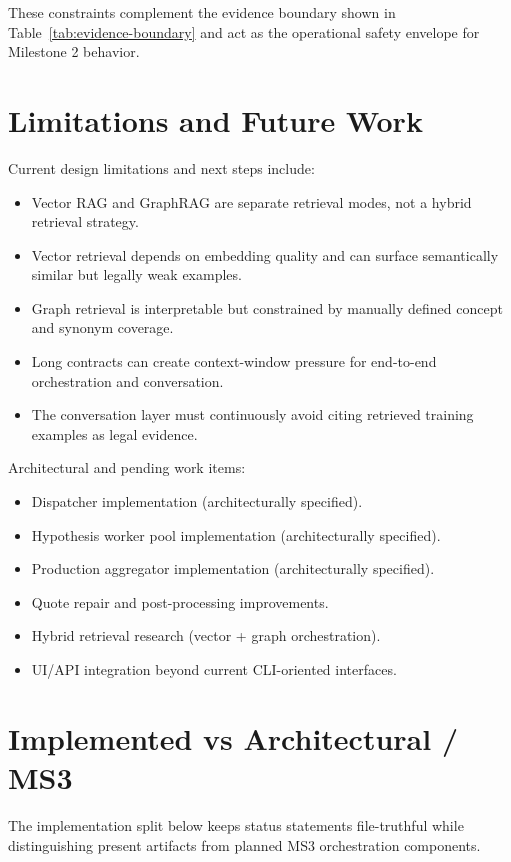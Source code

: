 \documentclass[11pt]{article}
\begin{document}
These constraints complement the evidence boundary shown in Table~\ref{tab:evidence-boundary} and act as the operational safety envelope for Milestone 2 behavior.

\section{Limitations and Future Work}
Current design limitations and next steps include:
\begin{itemize}
  \item Vector RAG and GraphRAG are separate retrieval modes, not a hybrid retrieval strategy.
  \item Vector retrieval depends on embedding quality and can surface semantically similar but legally weak examples.
  \item Graph retrieval is interpretable but constrained by manually defined concept and synonym coverage.
  \item Long contracts can create context-window pressure for end-to-end orchestration and conversation.
  \item The conversation layer must continuously avoid citing retrieved training examples as legal evidence.
\end{itemize}

Architectural and pending work items:
\begin{itemize}
  \item Dispatcher implementation (architecturally specified).
  \item Hypothesis worker pool implementation (architecturally specified).
  \item Production aggregator implementation (architecturally specified).
  \item Quote repair and post-processing improvements.
  \item Hybrid retrieval research (vector + graph orchestration).
  \item UI/API integration beyond current CLI-oriented interfaces.
\end{itemize}

\section{Implemented vs Architectural / MS3}
The implementation split below keeps status statements file-truthful while distinguishing present artifacts from planned MS3 orchestration components.
\end{document}
